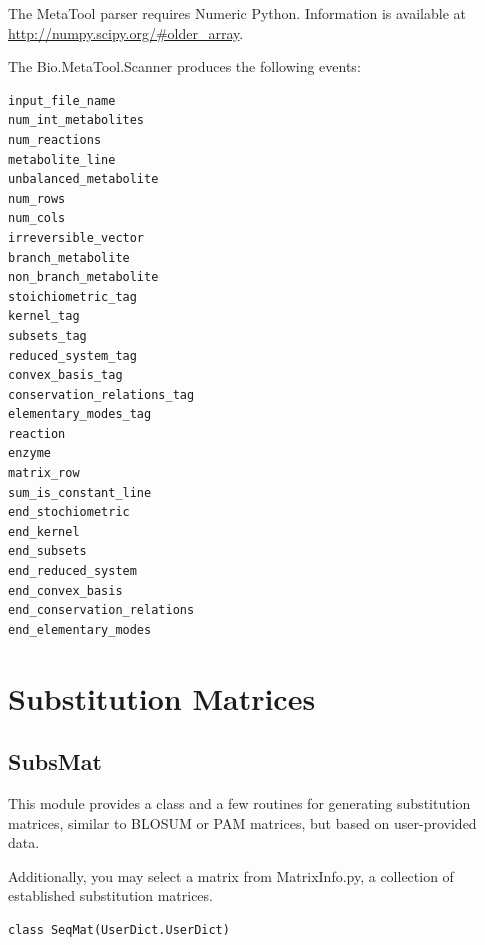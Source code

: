 \documentclass{report}
\begin{document}
The MetaTool parser requires Numeric Python. Information is available at
\url{http://numpy.scipy.org/#older_array}.

The Bio.MetaTool.Scanner produces the following events:
\begin{verbatim}
input_file_name
num_int_metabolites
num_reactions
metabolite_line
unbalanced_metabolite
num_rows
num_cols
irreversible_vector
branch_metabolite
non_branch_metabolite
stoichiometric_tag
kernel_tag
subsets_tag
reduced_system_tag
convex_basis_tag
conservation_relations_tag
elementary_modes_tag
reaction
enzyme
matrix_row
sum_is_constant_line
end_stochiometric
end_kernel
end_subsets
end_reduced_system
end_convex_basis
end_conservation_relations
end_elementary_modes
\end{verbatim}

\section{Substitution Matrices}

\subsection{SubsMat}

This module provides a class and a few routines for generating substitution matrices, similar to BLOSUM or PAM matrices, but based on user-provided data.

Additionally, you may select a matrix from MatrixInfo.py, a collection of established substitution matrices.

\begin{verbatim}
class SeqMat(UserDict.UserDict)
\end{verbatim}
\end{document}
